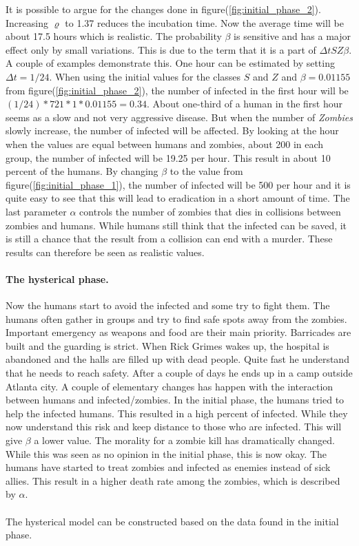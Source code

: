 \documentclass[%
twoside,                 %
final,                   %
10pt]{article}
\begin{document}
It is possible to argue for the changes done in figure(\ref{fig:initial_phase_2}). Increasing $\varrho$ to 1.37 reduces the incubation time. Now the average time will be about 17.5 hours which is realistic. The probability $\beta$ is sensitive and has a major effect only by small variations. This is due to the term that it is a part of $\Delta t SZ \beta$. A couple of examples demonstrate this. One hour can be estimated by setting $\Delta t = 1/24$. When using the initial values for the classes $S$ and $Z$ and $\beta=0.01155$ from figure(\ref{fig:initial_phase_2}), the number of infected in the first hour will be $(1/24)*721*1*0.01155=0.34$. About  one-third of a human in the first hour seems as a slow and not very aggressive disease. But when the number of \emph{Zombies} slowly increase, the number of infected will be affected. By looking at the hour when the values are equal between humans and zombies, about 200 in each group, the number of infected will be 19.25 per hour. This result in about 10 percent of the humans. By changing $\beta$ to the value from figure(\ref{fig:initial_phase_1}), the number of infected will be 500 per hour and it is quite easy to see that this will lead to eradication in a short amount of time. The last parameter $\alpha$ controls the number of zombies that dies in collisions between zombies and humans. While humans still think that the infected can be saved, it is still a chance that the result from a collision can end with a murder. These results can therefore be seen as realistic values.

\paragraph{The hysterical phase.}
Now the humans start to avoid the infected and some try to fight them. The humans often gather in groups and try to find safe spots away from the zombies. Important emergency as weapons and food are their main priority. Barricades are built and the guarding is strict. When Rick Grimes wakes up, the hospital is abandoned and the halls are filled up with dead people. Quite fast he understand that he needs to reach safety. After a couple of days he ends up in a camp outside Atlanta city. A couple of elementary changes has happen with the interaction between humans and infected/zombies. In the initial phase, the humans tried to help the infected humans. This resulted in a high percent of infected. While they now understand this risk and keep distance to those who are infected. This will give $\beta$ a lower value. The morality for a zombie kill has dramatically changed. While this was seen as no opinion in the initial phase, this is now okay. The humans have started to treat zombies and infected as enemies instead of sick allies. This result in a higher death rate among the zombies, which is described by $\alpha$. 
\\
\\
The hysterical model can be constructed based on the data found in the initial phase. 
\end{document}
